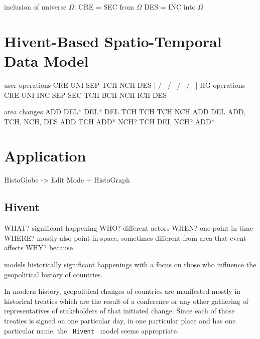 inclusion of universe $\Omega$:
CRE = SEC from $\Omega$
DES = INC into $\Omega$



\section{Hivent-Based Spatio-Temporal Data Model} %
\label{sub:hivent_based_spatio_temporal_data_model}

user operations     CRE     UNI          SEP         TCH         NCH      DES
                     |      / \         /   \        /  \       /   \      |
HG operations       CRE   UNI   INC   SEP   SEC   TCH   BCH   NCH   ICH   DES

area changes        ADD   DEL*  DEL*  DEL   TCH   TCH   TCH   NCH   ADD   DEL
ADD, TCH, NCH, DES        ADD   TCH   ADD*  NCH?        TCH         DEL
                                NCH?        ADD*







\section{Application} %
\label{sub:application}


HistoGlobe -> Edit Mode + HistoGraph



\subsection{Hivent} %
\label{ssub:hivent}

  WHAT? significant happening
  WHO? different actors
  WHEN? one point in time
  WHERE? mostly also point in space, sometimes different from area that event affects
  WHY? because

models historically significant happenings with a focus on those who influence the geopolitical history of countries.

In modern history, geopolitical changes of countries are manifested mostly in historical treaties which are the result of a conference or any other gathering of representatives of stakeholders of that initiated change. Since each of those treaties is signed on one particular day, in one particular place and has one particular name, the ~\texttt{Hivent}~ model seems appropriate.

